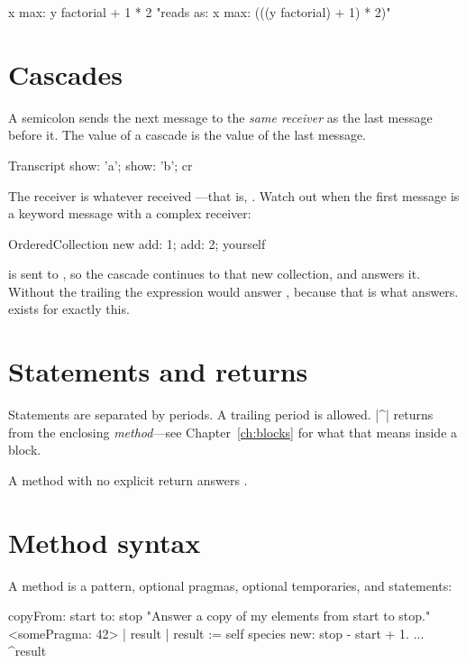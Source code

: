 \begin{st}
x max: y factorial + 1 * 2
"reads as:   x max: (((y factorial) + 1) * 2)"
\end{st}

\section{Cascades}

A semicolon sends the next message to the \emph{same receiver} as the last
message before it. The value of a cascade is the value of the last message.

\begin{st}
Transcript show: 'a'; show: 'b'; cr
\end{st}

The receiver is whatever received ---that is, .
Watch out when the first message is a keyword message with a complex
receiver:

\begin{st}
OrderedCollection new add: 1; add: 2; yourself
\end{st}

 is sent to , so the cascade continues to
that new collection, and  answers it. Without the trailing
 the expression would answer , because that is what
 answers.  exists for exactly this.

\section{Statements and returns}

Statements are separated by periods. A trailing period is allowed. \ct|^|
returns from the enclosing \emph{method}---see Chapter~\ref{ch:blocks} for
what that means inside a block.

A method with no explicit return answers .

\section{Method syntax}

A method is a pattern, optional pragmas, optional temporaries, and statements:

\begin{st}
copyFrom: start to: stop
    "Answer a copy of my elements from start to stop."
    <somePragma: 42>
    | result |
    result := self species new: stop - start + 1.
    ...
    ^result
\end{st}

